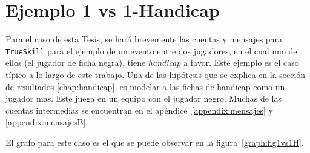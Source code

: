 \documentclass[11pt,twoside,spanish]{report} %
\begin{document}

\section{Ejemplo 1 vs 1-Handicap}\label{appendix:ej}

Para el caso de esta Tesis, se har\'a brevemente las cuentas y mensajes para \texttt{TrueSkill} para el ejemplo de un evento entre dos jugadores, en el cual uno de ellos (el jugador de ficha negra), tiene \textit{handicap} a favor.
Este ejemplo es el caso t\'ipico a lo largo de este trabajo.
Una de las hip\'otesis que se explica en la secci\'on de resultados \ref{chap:handicap}, es modelar a las fichas de handicap como un jugador mas.
Este juega en un equipo con el jugador negro.
Muchas de las cuentas intermedias se encuentran en el ap\'endice~\ref{appendix:mensajes} y \ref{appendix:mensajesB}.

El grafo para este caso es el que se puede observar en la figura~\ref{graph:fig1vs1H}.
\end{document}
